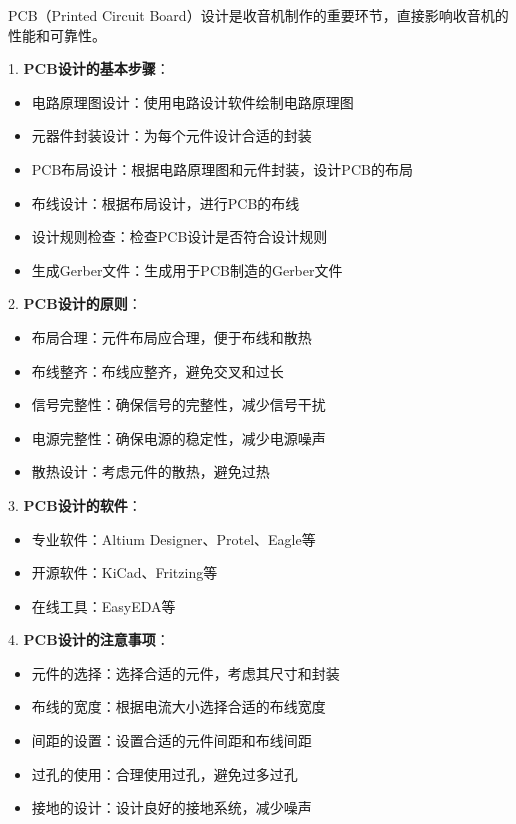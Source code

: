 \documentclass[12pt,UTF8]{ctexbook}
\begin{document}
PCB（Printed Circuit Board）设计是收音机制作的重要环节，直接影响收音机的性能和可靠性。

1. \textbf{PCB设计的基本步骤}：
   \begin{itemize}[leftmargin=3.5em]
   \item 电路原理图设计：使用电路设计软件绘制电路原理图
   \item 元器件封装设计：为每个元件设计合适的封装
   \item PCB布局设计：根据电路原理图和元件封装，设计PCB的布局
   \item 布线设计：根据布局设计，进行PCB的布线
   \item 设计规则检查：检查PCB设计是否符合设计规则
   \item 生成Gerber文件：生成用于PCB制造的Gerber文件
   \end{itemize}

2. \textbf{PCB设计的原则}：
   \begin{itemize}[leftmargin=3.5em]
   \item 布局合理：元件布局应合理，便于布线和散热
   \item 布线整齐：布线应整齐，避免交叉和过长
   \item 信号完整性：确保信号的完整性，减少信号干扰
   \item 电源完整性：确保电源的稳定性，减少电源噪声
   \item 散热设计：考虑元件的散热，避免过热
   \end{itemize}

3. \textbf{PCB设计的软件}：
   \begin{itemize}[leftmargin=3.5em]
   \item 专业软件：Altium Designer、Protel、Eagle等
   \item 开源软件：KiCad、Fritzing等
   \item 在线工具：EasyEDA等
   \end{itemize}

4. \textbf{PCB设计的注意事项}：
   \begin{itemize}[leftmargin=3.5em]
   \item 元件的选择：选择合适的元件，考虑其尺寸和封装
   \item 布线的宽度：根据电流大小选择合适的布线宽度
   \item 间距的设置：设置合适的元件间距和布线间距
   \item 过孔的使用：合理使用过孔，避免过多过孔
   \item 接地的设计：设计良好的接地系统，减少噪声
   \end{itemize}
\end{document}
